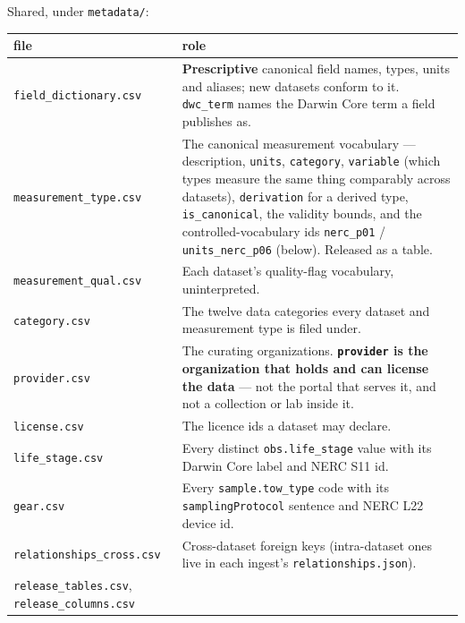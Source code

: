 \documentclass[
  letterpaper,
  DIV=11,
  numbers=noendperiod]{scrreprt}
\begin{document}
Shared, under \texttt{metadata/}:

\begin{longtable}[]{@{}
  >{\raggedright\arraybackslash}p{}
  >{\raggedright\arraybackslash}p{}@{}}
\toprule\noalign{}
\begin{minipage}[b]{\linewidth}\raggedright
file
\end{minipage} & \begin{minipage}[b]{\linewidth}\raggedright
role
\end{minipage} \\
\midrule\noalign{}
\endhead
\bottomrule\noalign{}
\endlastfoot
\texttt{field\_dictionary.csv} & \textbf{Prescriptive} canonical field
names, types, units and aliases; new datasets conform to it.
\texttt{dwc\_term} names the Darwin Core term a field publishes as. \\
\texttt{measurement\_type.csv} & The canonical measurement vocabulary
--- description, \texttt{units}, \texttt{category}, \texttt{variable}
(which types measure the same thing comparably across datasets),
\texttt{derivation} for a derived type, \texttt{is\_canonical}, the
validity bounds, and the controlled-vocabulary ids \texttt{nerc\_p01} /
\texttt{units\_nerc\_p06} (below). Released as a table. \\
\texttt{measurement\_qual.csv} & Each dataset's quality-flag vocabulary,
uninterpreted. \\
\texttt{category.csv} & The twelve data categories every dataset and
measurement type is filed under. \\
\texttt{provider.csv} & The curating organizations.
\textbf{\texttt{provider} is the organization that holds and can license
the data} --- not the portal that serves it, and not a collection or lab
inside it. \\
\texttt{license.csv} & The licence ids a dataset may declare. \\
\texttt{life\_stage.csv} & Every distinct \texttt{obs.life\_stage} value
with its Darwin Core label and NERC S11 id. \\
\texttt{gear.csv} & Every \texttt{sample.tow\_type} code with its
\texttt{samplingProtocol} sentence and NERC L22 device id. \\
\texttt{relationships\_cross.csv} & Cross-dataset foreign keys
(intra-dataset ones live in each ingest's
\texttt{relationships.json}). \\
\texttt{release\_tables.csv}, \texttt{release\_columns.csv} &

\end{longtable}
\end{document}
